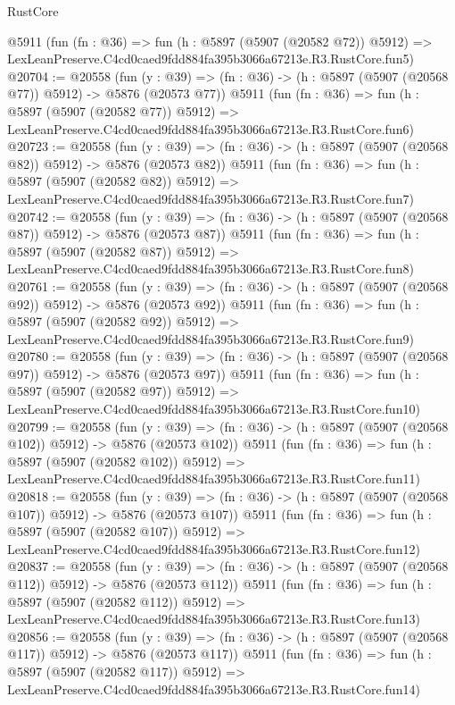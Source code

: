 \begin{lexlean}{RustCore}
\begin{coremodule}
    @5911
    (fun (fn : @36) =>
    fun (h : @5897 (@5907 (@20582 @72)) @5912) =>
    LexLeanPreserve.C4cd0caed9fdd884fa395b3066a67213e.R3.RustCore.fun5)
@20704 := @20558
    (fun (y : @39) => (fn : @36) -> (h : @5897 (@5907 (@20568 @77)) @5912) -> @5876 (@20573 @77))
    @5911
    (fun (fn : @36) =>
    fun (h : @5897 (@5907 (@20582 @77)) @5912) =>
    LexLeanPreserve.C4cd0caed9fdd884fa395b3066a67213e.R3.RustCore.fun6)
@20723 := @20558
    (fun (y : @39) => (fn : @36) -> (h : @5897 (@5907 (@20568 @82)) @5912) -> @5876 (@20573 @82))
    @5911
    (fun (fn : @36) =>
    fun (h : @5897 (@5907 (@20582 @82)) @5912) =>
    LexLeanPreserve.C4cd0caed9fdd884fa395b3066a67213e.R3.RustCore.fun7)
@20742 := @20558
    (fun (y : @39) => (fn : @36) -> (h : @5897 (@5907 (@20568 @87)) @5912) -> @5876 (@20573 @87))
    @5911
    (fun (fn : @36) =>
    fun (h : @5897 (@5907 (@20582 @87)) @5912) =>
    LexLeanPreserve.C4cd0caed9fdd884fa395b3066a67213e.R3.RustCore.fun8)
@20761 := @20558
    (fun (y : @39) => (fn : @36) -> (h : @5897 (@5907 (@20568 @92)) @5912) -> @5876 (@20573 @92))
    @5911
    (fun (fn : @36) =>
    fun (h : @5897 (@5907 (@20582 @92)) @5912) =>
    LexLeanPreserve.C4cd0caed9fdd884fa395b3066a67213e.R3.RustCore.fun9)
@20780 := @20558
    (fun (y : @39) => (fn : @36) -> (h : @5897 (@5907 (@20568 @97)) @5912) -> @5876 (@20573 @97))
    @5911
    (fun (fn : @36) =>
    fun (h : @5897 (@5907 (@20582 @97)) @5912) =>
    LexLeanPreserve.C4cd0caed9fdd884fa395b3066a67213e.R3.RustCore.fun10)
@20799 := @20558
    (fun (y : @39) => (fn : @36) -> (h : @5897 (@5907 (@20568 @102)) @5912) -> @5876 (@20573 @102))
    @5911
    (fun (fn : @36) =>
    fun (h : @5897 (@5907 (@20582 @102)) @5912) =>
    LexLeanPreserve.C4cd0caed9fdd884fa395b3066a67213e.R3.RustCore.fun11)
@20818 := @20558
    (fun (y : @39) => (fn : @36) -> (h : @5897 (@5907 (@20568 @107)) @5912) -> @5876 (@20573 @107))
    @5911
    (fun (fn : @36) =>
    fun (h : @5897 (@5907 (@20582 @107)) @5912) =>
    LexLeanPreserve.C4cd0caed9fdd884fa395b3066a67213e.R3.RustCore.fun12)
@20837 := @20558
    (fun (y : @39) => (fn : @36) -> (h : @5897 (@5907 (@20568 @112)) @5912) -> @5876 (@20573 @112))
    @5911
    (fun (fn : @36) =>
    fun (h : @5897 (@5907 (@20582 @112)) @5912) =>
    LexLeanPreserve.C4cd0caed9fdd884fa395b3066a67213e.R3.RustCore.fun13)
@20856 := @20558
    (fun (y : @39) => (fn : @36) -> (h : @5897 (@5907 (@20568 @117)) @5912) -> @5876 (@20573 @117))
    @5911
    (fun (fn : @36) =>
    fun (h : @5897 (@5907 (@20582 @117)) @5912) =>
    LexLeanPreserve.C4cd0caed9fdd884fa395b3066a67213e.R3.RustCore.fun14)

\end{coremodule}
\end{lexlean}
